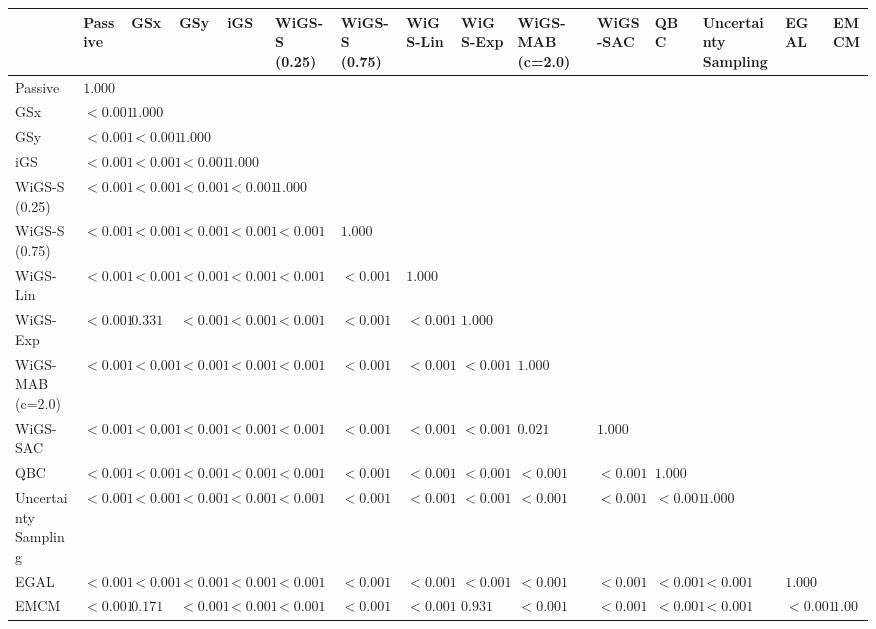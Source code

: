 \begin{tabular}{lllllllllllllll}
\toprule
 & Passive & GSx & GSy & iGS & WiGS-S (0.25) & WiGS-S (0.75) & WiGS-Lin & WiGS-Exp & WiGS-MAB (c=2.0) & WiGS-SAC & QBC & Uncertainty Sampling & EGAL & EMCM \\
\midrule
Passive & $1.000$ &  &  &  &  &  &  &  &  &  &  &  &  &  \\
GSx & $<0.001$ & $1.000$ &  &  &  &  &  &  &  &  &  &  &  &  \\
GSy & $<0.001$ & $<0.001$ & $1.000$ &  &  &  &  &  &  &  &  &  &  &  \\
iGS & $<0.001$ & $<0.001$ & $<0.001$ & $1.000$ &  &  &  &  &  &  &  &  &  &  \\
WiGS-S (0.25) & $<0.001$ & $<0.001$ & $<0.001$ & $<0.001$ & $1.000$ &  &  &  &  &  &  &  &  &  \\
WiGS-S (0.75) & $<0.001$ & $<0.001$ & $<0.001$ & $<0.001$ & $<0.001$ & $1.000$ &  &  &  &  &  &  &  &  \\
WiGS-Lin & $<0.001$ & $<0.001$ & $<0.001$ & $<0.001$ & $<0.001$ & $<0.001$ & $1.000$ &  &  &  &  &  &  &  \\
WiGS-Exp & $<0.001$ & $0.331$ & $<0.001$ & $<0.001$ & $<0.001$ & $<0.001$ & $<0.001$ & $1.000$ &  &  &  &  &  &  \\
WiGS-MAB (c=2.0) & $<0.001$ & $<0.001$ & $<0.001$ & $<0.001$ & $<0.001$ & $<0.001$ & $<0.001$ & $<0.001$ & $1.000$ &  &  &  &  &  \\
WiGS-SAC & $<0.001$ & $<0.001$ & $<0.001$ & $<0.001$ & $<0.001$ & $<0.001$ & $<0.001$ & $<0.001$ & $0.021$ & $1.000$ &  &  &  &  \\
QBC & $<0.001$ & $<0.001$ & $<0.001$ & $<0.001$ & $<0.001$ & $<0.001$ & $<0.001$ & $<0.001$ & $<0.001$ & $<0.001$ & $1.000$ &  &  &  \\
Uncertainty Sampling & $<0.001$ & $<0.001$ & $<0.001$ & $<0.001$ & $<0.001$ & $<0.001$ & $<0.001$ & $<0.001$ & $<0.001$ & $<0.001$ & $<0.001$ & $1.000$ &  &  \\
EGAL & $<0.001$ & $<0.001$ & $<0.001$ & $<0.001$ & $<0.001$ & $<0.001$ & $<0.001$ & $<0.001$ & $<0.001$ & $<0.001$ & $<0.001$ & $<0.001$ & $1.000$ &  \\
EMCM & $<0.001$ & $0.171$ & $<0.001$ & $<0.001$ & $<0.001$ & $<0.001$ & $<0.001$ & $0.931$ & $<0.001$ & $<0.001$ & $<0.001$ & $<0.001$ & $<0.001$ & $1.000$ \\
\bottomrule
\end{tabular}
